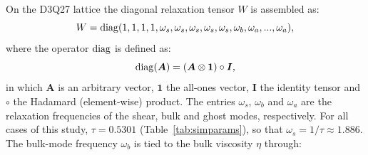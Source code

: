 On the D3Q27 lattice the diagonal relaxation tensor $W$ is assembled as:
\begin{equation}
    W={\rm diag}(1,1,1,1,\omega_{s},\omega_{s},\omega_{s},\omega_{s},\omega_{s},\omega_{b},\omega_{a},...,\omega_{a}),
\end{equation}
where the operator ${\rm diag}$ is defined as:
\begin{equation}
    {\rm diag}(\bm{A}) = (\bm{A}\otimes\bm{1})\circ \bm{I},
\end{equation}
in which $\bm{A}$ is an arbitrary vector, $\bm{1}$ the all-ones vector, $\bm{I}$ the identity tensor and $\circ$ the Hadamard (element-wise) product. The entries $\omega_s$, $\omega_b$ and $\omega_a$ are the relaxation frequencies of the shear, bulk and ghost modes, respectively. For all cases of this study, $\tau = 0.5301$ (Table~\ref{tab:simparams}), so that $\omega_s = 1/\tau \approx 1.886$. The bulk-mode frequency $\omega_b$ is tied to the bulk viscosity $\eta$ through:
